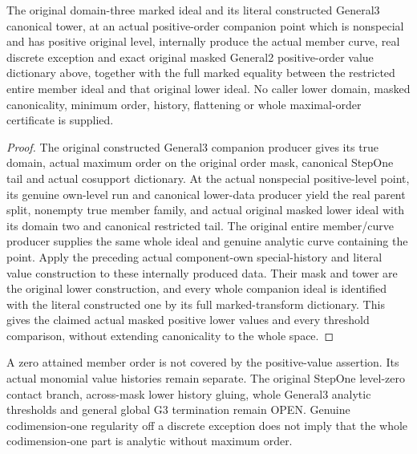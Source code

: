 \begin{theorem}
\label{hir:member-masked-positive-general-three-consumer}
\leanok
The original domain-three marked ideal and its literal constructed General3
canonical tower, at an actual positive-order companion point which is
nonspecial and has positive original level, internally produce the actual
member curve, real discrete exception and exact original masked General2
positive-order value dictionary above, together with the full marked equality
between the restricted entire member ideal and that original lower ideal. No caller lower domain, masked
canonicality, minimum order, history, flattening or whole maximal-order
certificate is supplied.
\end{theorem}
\begin{proof}
The original constructed General3 companion producer gives its true domain,
actual maximum order on the original order mask, canonical StepOne tail and
actual cosupport dictionary. At the actual nonspecial positive-level point,
its genuine own-level run and canonical lower-data producer yield the real
parent split, nonempty true member family, and actual original masked lower
ideal with its domain two and canonical restricted tail. The original entire
member/curve producer supplies the same whole ideal and genuine analytic
curve containing the point. Apply the preceding actual component-own
special-history and literal value construction to these internally produced
data. Their mask and tower are the original lower construction, and every
whole companion ideal is identified with the literal constructed one by
its full marked-transform dictionary. This gives the claimed actual masked
positive lower values and every threshold comparison, without extending
canonicality to the whole space.
\end{proof}

\begin{remark}
A zero attained member order is not covered by the positive-value assertion.
Its actual monomial value histories remain separate. The original StepOne
level-zero contact branch, across-mask lower history gluing, whole General3
analytic thresholds and general global G3 termination remain OPEN. Genuine
codimension-one regularity off a discrete exception does not imply that the
whole codimension-one part is analytic without maximum order.
\end{remark}
